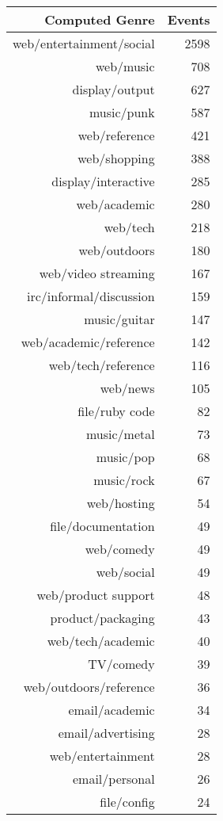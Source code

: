 \begin{table}[ht]
\centering
\begin{tabular}{rr}
      \hline
      Computed Genre & Events \\ 
      \hline
      web/entertainment/social & 2598 \\ 
      web/music & 708 \\ 
      display/output & 627 \\ 
      music/punk & 587 \\ 
      web/reference & 421 \\ 
      web/shopping & 388 \\ 
      display/interactive & 285 \\ 
      web/academic & 280 \\ 
      web/tech & 218 \\ 
      web/outdoors & 180 \\ 
      web/video streaming & 167 \\ 
      irc/informal/discussion & 159 \\ 
      music/guitar & 147 \\ 
      web/academic/reference & 142 \\ 
      web/tech/reference & 116 \\ 
      web/news & 105 \\ 
      file/ruby code &  82 \\ 
      music/metal &  73 \\ 
      music/pop &  68 \\ 
      music/rock &  67 \\ 
      web/hosting &  54 \\ 
      file/documentation &  49 \\ 
      web/comedy &  49 \\ 
      web/social &  49 \\ 
      web/product support &  48 \\ 
      product/packaging &  43 \\ 
      web/tech/academic &  40 \\ 
      TV/comedy &  39 \\ 
      web/outdoors/reference &  36 \\ 
      email/academic &  34 \\ 
      email/advertising &  28 \\ 
      web/entertainment &  28 \\ 
      email/personal &  26 \\ 
      file/config &  24 \\ 

\end{tabular}
\end{table}
